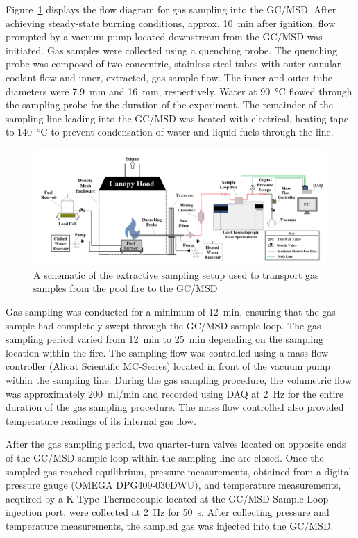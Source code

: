 \documentclass[12pt]{article}
\begin{document}
Figure~\ref{fig:Experimental_Setup} displays the flow diagram for gas sampling into the GC/MSD. After achieving steady-state burning conditions, approx. 10~\si{min} after ignition, flow prompted by a vacuum pump located downstream from the GC/MSD was initiated. Gas samples were collected using a quenching probe. The quenching probe was composed of two concentric, stainless-steel tubes with outer annular coolant flow and inner, extracted, gas-sample flow. The inner and outer tube diameters were 7.9~\si{mm} and 16~\si{mm}, respectively. Water at 90~°\si{C} flowed through the sampling probe for the duration of the experiment. The remainder of the sampling line leading into the GC/MSD was heated with electrical, heating tape to 140~°\si{C} to prevent condensation of water and liquid fuels through the line.

\begin{figure}
	\centering
\includegraphics[width=\textwidth,keepaspectratio]{Experimental_Setup.png}
	\caption[A schematic of the gas sampling procedure]{A schematic of the extractive sampling setup used to transport gas samples from the pool fire to the GC/MSD}
	\label{fig:Experimental_Setup}
\end{figure}

Gas sampling was conducted for a minimum of 12~\si{min}, ensuring that the gas sample had completely swept through the GC/MSD sample loop. The gas sampling period varied from 12~\si{min} to 25~\si{min} depending on the sampling location within the fire. The sampling flow was controlled using a mass flow controller (Alicat Scientific MC-Series) located in front of the vacuum pump within the sampling line. During the gas sampling procedure, the volumetric flow was approximately 200~\si{ml/min} and recorded using DAQ at 2~\si{Hz} for the entire duration of the gas sampling procedure. The mass flow controlled also provided temperature readings of its internal gas flow.

After the gas sampling period, two quarter-turn valves located on opposite ends of the GC/MSD sample loop within the sampling line are closed. Once the sampled gas reached equilibrium, pressure measurements, obtained from a digital pressure gauge (OMEGA DPG409-030DWU), and temperature measurements, acquired by a K Type Thermocouple located at the GC/MSD Sample Loop injection port, were collected at 2~\si{Hz} for 50~\si{s}. After collecting pressure and temperature measurements, the sampled gas was injected into the GC/MSD.
\end{document}
